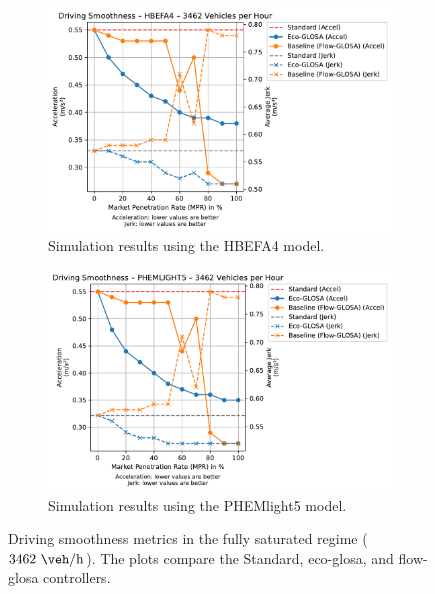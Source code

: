 \begin{figure}[htbp]
  \centering
  \begin{subfigure}[b]{0.98\textwidth}
    \includegraphics[width=\textwidth]{data/img/DrivingSmoothness/DrivingSmoothness_HBEFA4_Cars3462.pdf}
    \caption{Simulation results using the HBEFA4 model.}
    \label{fig:Smoothness_HBEFA4_3462}
  \end{subfigure}
  \begin{subfigure}[b]{0.98\textwidth}
    \includegraphics[width=\textwidth]{data/img/DrivingSmoothness/DrivingSmoothness_PHEMLIGHT5_Cars3462.pdf}
    \caption{Simulation results using the PHEMlight5 model.}
    \label{fig:Smoothness_PHEMlight5_3462}
  \end{subfigure}
  \caption[Driving smoothness metrics at $3462~\unit{\veh\per\hour}$]{Driving smoothness metrics in the fully saturated regime ($3462~\unit{\veh\per\hour}$). The plots compare the Standard, \ac{eco-glosa}, and \ac{flow-glosa} controllers.}
  \label{fig:Smoothness_3462}
\end{figure}


